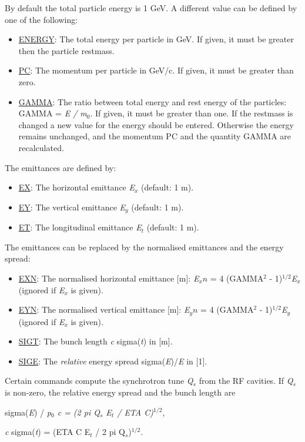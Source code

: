  By default the total particle energy is 1 GeV. A different value can be defined by one of the following: 
\begin{itemize}
	\item \href{energy}{ENERGY}: The total energy per particle in GeV. If given, it must be greater then the particle restmass. 
	\item \href{pc}{PC}: The momentum per particle in GeV/c. If given, it must be greater than zero. 
	\item \href{gamma}{GAMMA}: The ratio between total energy and rest energy of the particles: GAMMA = \textit{E / m$_0$}. If given, it must be greater than one. If the restmass is changed a new value for the energy should be entered. Otherwise the energy remains unchanged, and the momentum PC and the quantity GAMMA are recalculated. 
\end{itemize}  The emittances are defined by: 
\begin{itemize}
	\item \href{ex}{EX}: The horizontal emittance \textit{E$_x$} (default: 1 m). 
	\item \href{ey}{EY}: The vertical emittance \textit{E$_y$} (default: 1 m). 
	\item \href{et}{ET}: The longitudinal emittance \textit{E$_t$} (default: 1 m). 
\end{itemize}  The emittances can be replaced by the normalised emittances and the energy spread: 
\begin{itemize}
	\item \href{exn}{EXN}: The normalised horizontal emittance [m]: \textit{E$_xn$} = 4 (GAMMA$^2$ - 1)$^{1/2}$\textit{E$_x$} (ignored if \textit{E$_x$} is given). 
	\item \href{eyn}{EYN}: The normalised vertical emittance [m]: \textit{E$_yn$} = 4 (GAMMA$^2$ - 1)$^{1/2}$\textit{E$_y$} (ignored if \textit{E$_x$} is given). 
	\item \href{sigt}{SIGT}: The bunch length \textit{c} sigma(\textit{t}) in [m]. 
	\item \href{sige}{SIGE}: The \emph{relative} energy spread sigma(\textit{E})/\textit{E} in [1]. 
\end{itemize} Certain commands compute the synchrotron tune \textit{Q$_s$} from the RF cavities. If \textit{Q$_s$} is non-zero, the relative energy spread and the bunch length are 

 sigma(\textit{E}) / \textit{p$_0$ c =  (2 pi Q$_s$ E$_t$ / ETA C)$^{1/2}$}, 

\textit{c} sigma(\textit{t}) = (ETA C E$_t$ / 2 pi Q$_s$)$^{1/2}$. 

